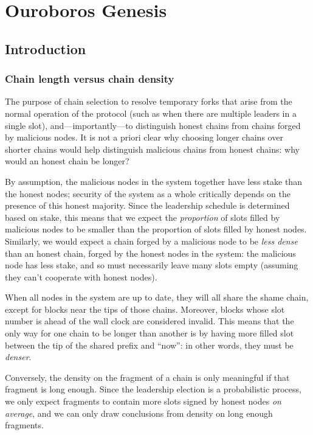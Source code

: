 \chapter{Ouroboros Genesis}
\label{genesis}

\section{Introduction}

\subsection{Chain length versus chain density}

The purpose of chain selection to resolve temporary forks that arise from the
normal operation of the protocol (such as when there are multiple leaders in a
single slot), and---importantly---to distinguish honest chains from chains
forged by malicious nodes. It is not a priori clear why choosing longer chains
over shorter chains would help distinguish malicious chains from honest chains:
why would an honest chain be longer?

By assumption, the malicious nodes in the system together have less stake than
the honest nodes; security of the system as a whole critically depends on the
presence of this honest majority. Since the leadership schedule is determined
based on stake, this means that we expect the \emph{proportion} of slots filled
by malicious nodes to be smaller than the proportion of slots filled by honest
nodes. Similarly, we would expect a chain forged by a malicious node to be
\emph{less dense} than an honest chain, forged by the honest nodes in the
system: the malicious node has less stake, and so must necessarily leave many
slots empty (assuming they can't cooperate with honest nodes).

When all nodes in the system are up to date, they will all share the shame
chain, except for blocks near the tips of those chains. Moreover, blocks whose
slot number is ahead of the wall clock are considered invalid. This means that
the only way for one chain to be longer than another is by having more filled
slot between the tip of the shared prefix and ``now'': in other words, they
must be \emph{denser}.
%
\begin{center}
\end{center}
%
Conversely, the density on the fragment of a chain is only meaningful if that
fragment is long enough. Since the leadership election is a probabilistic
process, we only expect fragments to contain more slots signed by honest nodes
\emph{on average}, and we can only draw conclusions from density on long enough
fragments.

